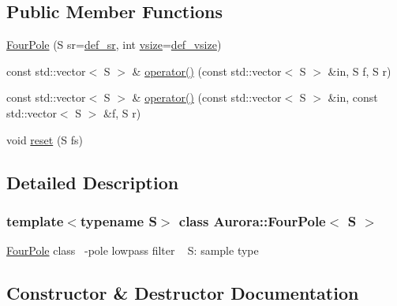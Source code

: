 \subsection*{Public Member Functions}
\begin{DoxyCompactItemize}
\item 
\hyperlink{class_aurora_1_1_four_pole_acd6f1e5b94bdc248e8e955f4ef8f7dcc}{Four\+Pole} (S sr=\hyperlink{namespace_aurora_ad49263d809bea98dd422e95bc91bc03e}{def\+\_\+sr}, int \hyperlink{class_aurora_1_1_snd_base_af9e21aaf411b17f7a8221c991ce5d291}{vsize}=\hyperlink{namespace_aurora_afaaddf667a06e7ce23c667a8b7295263}{def\+\_\+vsize})
\item 
const std\+::vector$<$ S $>$ \& \hyperlink{class_aurora_1_1_four_pole_ac3cfee8b5d8f0bf8d0b0c6784eb81fef}{operator()} (const std\+::vector$<$ S $>$ \&in, S f, S r)
\item 
const std\+::vector$<$ S $>$ \& \hyperlink{class_aurora_1_1_four_pole_a300ec87b54b5e8c5c76c1005fe31c9d9}{operator()} (const std\+::vector$<$ S $>$ \&in, const std\+::vector$<$ S $>$ \&f, S r)
\item 
void \hyperlink{class_aurora_1_1_four_pole_a5de080ccd74617a6bfba13d3d76bcb4b}{reset} (S fs)
\end{DoxyCompactItemize}


\subsection{Detailed Description}
\subsubsection*{template$<$typename S$>$\newline
class Aurora\+::\+Four\+Pole$<$ S $>$}

\hyperlink{class_aurora_1_1_four_pole}{Four\+Pole} class ~-\/pole lowpass filter ~\newline
S\+: sample type 

\subsection{Constructor \& Destructor Documentation}
\mbox{\label{class_aurora_1_1_four_pole_acd6f1e5b94bdc248e8e955f4ef8f7dcc}} 

